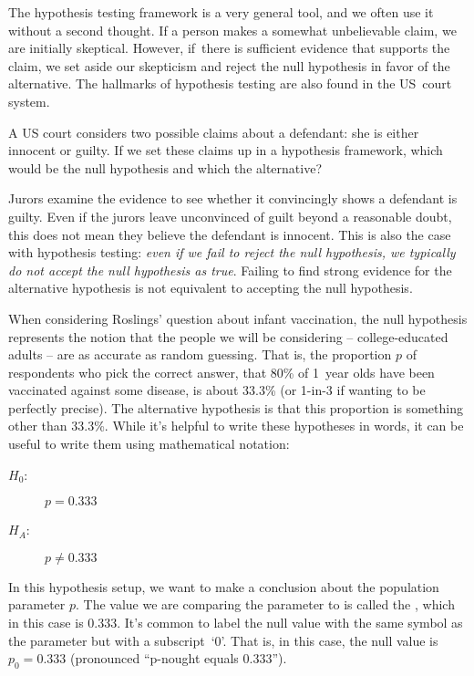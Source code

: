The hypothesis testing framework is a very general tool, and we often use it without a second thought. If a person makes a somewhat unbelievable claim, we are initially skeptical. However, if~there is sufficient evidence that supports the claim, we set aside our skepticism and reject the null hypothesis in favor of the alternative. The hallmarks of hypothesis testing are also found in the US~court system. 

\D{\newpage}

\begin{exercisewrap}
\begin{nexercise} \label{hypTestCourtExample}
A US court considers two possible claims about a defendant: she is either innocent or guilty. If we set these claims up in a hypothesis framework, which would be the null hypothesis and which the alternative?\footnotemark
\end{nexercise}
\end{exercisewrap}

Jurors examine the evidence to see whether it convincingly
shows a defendant is guilty.
Even if the jurors leave unconvinced of guilt beyond
a reasonable doubt, this does not mean they believe the
defendant is innocent.
This is also the case with hypothesis testing:
\emph{even if we fail to reject the null hypothesis,
we typically do not accept the null hypothesis as true}.
Failing to find strong evidence for the alternative
hypothesis is not equivalent to accepting
the null hypothesis.

When considering Roslings' question about infant vaccination,
the null hypothesis represents the notion that the people
we will be considering -- college-educated adults --
are as accurate as random guessing.
That is, the proportion
$p$ of respondents who pick the correct
answer, that 80\% of 1~year olds have been vaccinated
against some disease, is about 33.3\%
(or 1-in-3 if wanting to be perfectly precise).
The alternative hypothesis is that this proportion is something
other than 33.3\%. While it's helpful to write these hypotheses
in words, it can be useful to write them using mathematical
notation:
\begin{description}
\item[$H_0$:] $p = 0.333$
\item[$H_A$:] $p \neq 0.333$
\end{description}
In this hypothesis setup, we want to make a conclusion about
the population parameter $p$. The value we are comparing the
parameter to is called the , which in this
case is 0.333. It's common to label the null value with the
same symbol as the parameter but with a subscript~`0'.
That is, in this case, the null value is $p_0 = 0.333$
(pronounced ``p-nought equals 0.333'').

